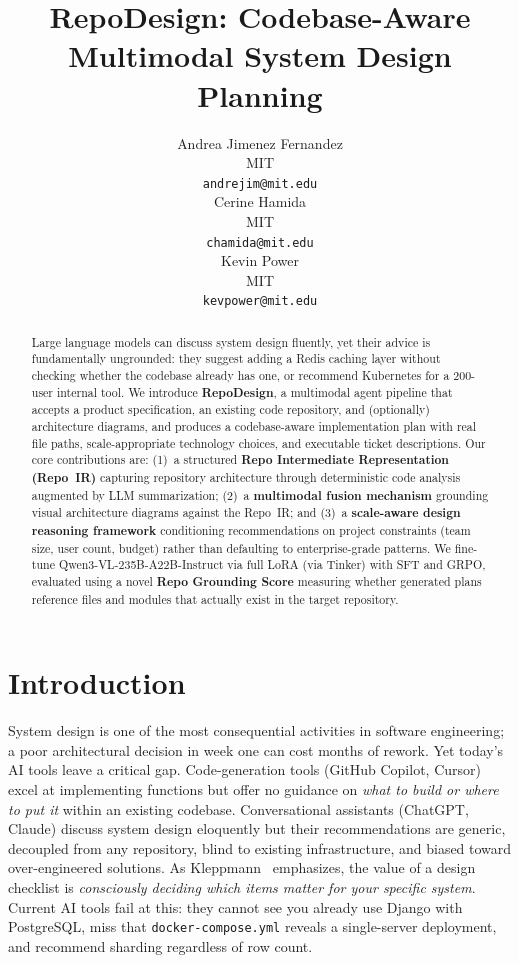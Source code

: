 \documentclass{article}
\title{RepoDesign: Codebase-Aware Multimodal System Design Planning}
\author{%
  Andrea Jimenez Fernandez \\
  MIT \\
  \texttt{andrejim@mit.edu} \\
  \And
  Cerine Hamida \\
  MIT \\
  \texttt{chamida@mit.edu} \\
  \And
  Kevin Power \\
  MIT \\
  \texttt{kevpower@mit.edu} \\
}
\begin{document}
\maketitle

\begin{abstract}
Large language models can discuss system design fluently, yet their advice is fundamentally ungrounded: they suggest adding a Redis caching layer without checking whether the codebase already has one, or recommend Kubernetes for a 200-user internal tool. We introduce \textbf{RepoDesign}, a multimodal agent pipeline that accepts a product specification, an existing code repository, and (optionally) architecture diagrams, and produces a codebase-aware implementation plan with real file paths, scale-appropriate technology choices, and executable ticket descriptions. Our core contributions are: (1)~a structured \textbf{Repo Intermediate Representation (Repo~IR)} capturing repository architecture through deterministic code analysis augmented by LLM summarization; (2)~a \textbf{multimodal fusion mechanism} grounding visual architecture diagrams against the Repo~IR; and (3)~a \textbf{scale-aware design reasoning framework} conditioning recommendations on project constraints (team size, user count, budget) rather than defaulting to enterprise-grade patterns. We fine-tune Qwen3-VL-235B-A22B-Instruct via full LoRA (via Tinker) with SFT and GRPO, evaluated using a novel \textbf{Repo Grounding Score} measuring whether generated plans reference files and modules that actually exist in the target repository.
\end{abstract}

\section{Introduction}

System design is one of the most consequential activities in software engineering; a poor architectural decision in week one can cost months of rework. Yet today's AI tools leave a critical gap. Code-generation tools (GitHub Copilot, Cursor) excel at implementing functions but offer no guidance on \emph{what to build or where to put it} within an existing codebase. Conversational assistants (ChatGPT, Claude) discuss system design eloquently but their recommendations are generic, decoupled from any repository, blind to existing infrastructure, and biased toward over-engineered solutions. As Kleppmann~\cite{kleppmann} emphasizes, the value of a design checklist is \emph{consciously deciding which items matter for your specific system}. Current AI tools fail at this: they cannot see you already use Django with PostgreSQL, miss that \texttt{docker-compose.yml} reveals a single-server deployment, and recommend sharding regardless of row count.
\end{document}
